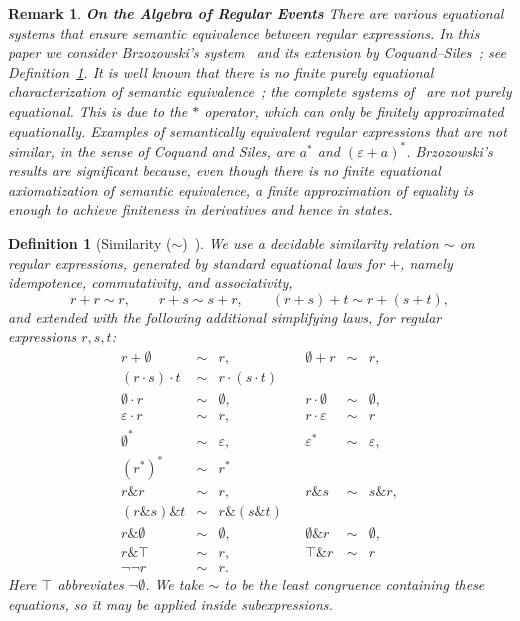 \documentclass{article}
\newtheorem{definition}{Definition}[section]
\newtheorem{remark}{Remark}[section]
\begin{document}
 \begin{remark}{\bf On the Algebra of Regular Events}
There are various equational systems that ensure semantic equivalence between regular expressions. In this paper we consider Brzozowski's system~\cite{B64} and its extension by Coquand--Siles~\cite{CoquandRegexEquality}; see Definition~\ref{def:similarity}. It is well known that there is no finite purely equational characterization of semantic equivalence~\cite{Redko}; the complete systems of~\cite{Salomaa,Kozen} are not purely equational. This is due to the $\ast$ operator, which can only be finitely approximated equationally. Examples of semantically equivalent regular expressions that are not similar, in the sense of Coquand and Siles, are $a^*$ and $(\varepsilon+a)^*$. Brzozowski's results are significant because, even though there is no finite equational axiomatization of semantic equivalence, a finite approximation of equality is enough to achieve finiteness in derivatives and hence in states.
\end{remark}

\begin{definition}[Similarity ($\sim$)~\cite{CoquandRegexEquality}]
\label{def:similarity}
We use a decidable \emph{similarity} relation $\sim$ on regular expressions,
generated by standard equational laws for $+$, namely idempotence,
commutativity, and associativity,
\[
r+r \sim r,
\qquad
r+s \sim s+r,
\qquad
(r+s)+t \sim r+(s+t),
\]
and extended with the following additional simplifying laws, for regular
expressions $r,s,t$:
\[
\begin{array}{rclcrcl}
r+\emptyset &\sim& r, &&
\emptyset+r &\sim& r,\\[0.6ex]

(r\cdot s)\cdot t &\sim& r\cdot(s\cdot t)\\[0.4ex]
\emptyset\cdot r &\sim& \emptyset, &&
r\cdot\emptyset &\sim& \emptyset,\\[0.4ex]
\varepsilon\cdot r &\sim& r, &&
r\cdot\varepsilon &\sim& r\\[0.8ex]

\emptyset^* &\sim& \varepsilon, &&
\varepsilon^* &\sim& \varepsilon,\\[0.4ex]
(r^*)^* &\sim& r^*
\\[0.8ex]

r\&r &\sim& r, &&
r\&s &\sim& s\&r,\\[0.4ex]
(r\&s)\&t &\sim& r\&(s\&t)\\[0.4ex]
r\&\emptyset &\sim& \emptyset, &&
\emptyset\&r &\sim& \emptyset,\\[0.4ex]
r\&\top &\sim& r, &&
\top\&r &\sim& r\\[0.8ex]

\neg\neg r &\sim& r.
\end{array}
\]
Here $\top$ abbreviates $\neg\emptyset$. We take $\sim$ to be the least congruence containing these equations, so it may be applied inside subexpressions.
\end{definition}
\end{document}
